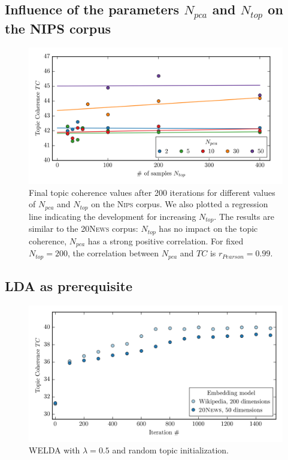 \documentclass[
        a4paper,
        titlepage,
        twoside,
        parskip
        ]{scrbook}
\theoremstyle{break}
\begin{document}
\begin{appendices}
  \subsection{Influence of the parameters $N_{pca}$ and $N_{top}$ on the N{\footnotesize IPS} corpus}
  \label{sec:appendix_welda_gaussian_nips_pca_samples}

  \begin{figure}[H]
         \centering
         \includegraphics[width=\textwidth]{figures/welda_gaussian_nips_pca_samples.png}
         \caption{Final topic coherence values after 200 iterations for different values of $N_{pca}$ and $N_{top}$ on the \textsc{Nips} corpus. We also plotted a regression line indicating the development for increasing $N_{top}$. The results are similar to the \textsc{20News} corpus: $N_{top}$ has no impact on the topic coherence, $N_{pca}$ has a strong positive correlation. For fixed $N_{top} = 200$, the correlation between $N_{pca}$ and $TC$ is $r_{Pearson} = 0.99$.}
         \label{fig:welda_gaussian_nips_pca_samples}
  \end{figure}

  \subsection{LDA as prerequisite}
  \label{sec:appendix_lda_prerequisite}
  \begin{figure}[H]
         \centering
         \includegraphics[width=\textwidth]{figures/welda_gaussian_random_init.png}
         \caption{WELDA with $\lambda = 0.5$ and random topic initialization. }
         \label{fig:standard_lda_as_prerequisite}
  \end{figure}


\end{appendices}
\end{document}
